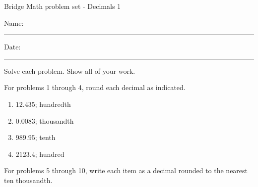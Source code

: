 \documentclass[12pt]{article}
\begin{document}
\pagestyle{empty} %
\begin{center}
          Bridge Math problem set - Decimals 1 \\[0.5in]
\end{center}
Name: \rule{4in}{0.005in} Date: \rule{1.5in}{0.005in} 
  \vspace{0.25in}

Solve each problem. Show all of your work. 

For problems 1 through 4, round each decimal as indicated. 
\begin{multicols}{2}
\begin{enumerate}

    \item \hspace{0.250in} $12.435$; hundredth
  \vspace{0.25in}

    \item \hspace{0.250in} $0.0083$; thousandth
  \vspace{0.25in}

    \item \hspace{0.250in} $989.95$; tenth
  \vspace{0.25in}

    \item \hspace{0.250in} $2123.4$; hundred
  \vspace{0.25in}

\end{enumerate}
\end{multicols}
For problems 5 through 10, write each item as a decimal rounded to the nearest ten thousandth.
\end{document}
